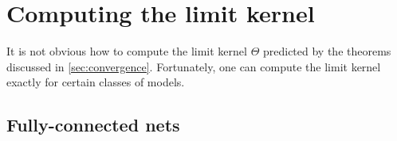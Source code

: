 \documentclass{article}
\newcommand{\EE}{\mathbb{E}\,}
\begin{document}



    \section{Computing the limit kernel}
    \label{sec:limit}

    It is not obvious how to compute the limit kernel $\Theta$ predicted by the theorems discussed in \cref{sec:convergence}.
    Fortunately, one can compute the limit kernel exactly for certain classes of models.


    \subsection{Fully-connected nets}
    \label{sec:limit_fc_nets}
\end{document}
